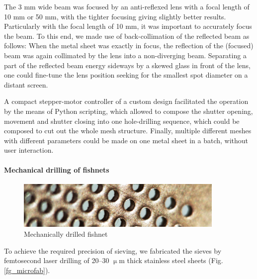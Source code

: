 The 3 mm wide beam was focused by an anti-reflexed lens with a focal length of 10 mm or 50 mm, with the tighter focusing giving slightly better results. Particularly with the focal length of 10 mm, it was important to accurately focus the beam. To this end, we made use of back-collimation of the reflected beam as follows: When the metal sheet was exactly in focus, the reflection of the (focused) beam was again collimated by the lens into a non-diverging beam. Separating a part of the reflected beam energy sideways by a skewed glass in front of the lens, one could fine-tune the lens position seeking for the smallest spot diameter on a distant screen.

A compact stepper-motor controller of a custom design \cite{dominec2015_triostepper} facilitated the operation by the means of Python scripting, which allowed to compose the shutter opening, movement and shutter closing into one hole-drilling sequence, which could be composed to cut out the whole mesh structure. Finally, multiple different meshes with different parameters could be made on one metal sheet in a batch, without user interaction.

\paragraph{Mechanical drilling of fishnets}%
\begin{figure}[ht] \caption{Mechanically drilled fishnet}  \centering \includegraphics[width=10cm]{img/fishnet.pdf} \end{figure}

To achieve the required precision of sieving, we fabricated the sieves by femtosecond laser drilling of 20--30 $\upmu$m thick stainless steel sheets (Fig. \ref{fg_microfab}). 


\todo{}
\todo{}

